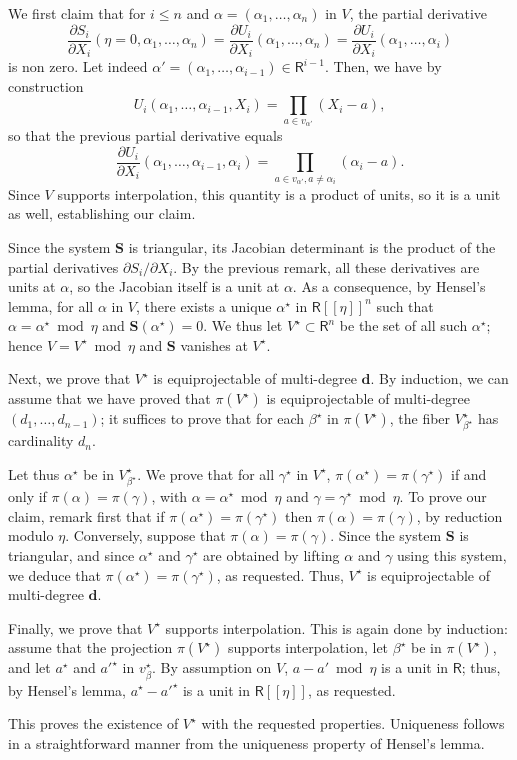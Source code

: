 \documentclass[amsthm]{elsart}
\def\d {\ensuremath{\mathbf{d}}}
\def\S {\ensuremath{\mathbf{S}}}
\def\rng {\ensuremath{\mathsf{R}}}
\theoremstyle{plain}
\begin{document}
\begin{pf}
We first claim that for $i \le n$ and $\alpha=(\alpha_1,\dots,\alpha_n)$ in $V$, the
partial derivative
$$\frac{\partial S_i}{\partial X_i}(\eta=0,\alpha_1,\dots,\alpha_n) = 
\frac{\partial U_i}{\partial X_i}(\alpha_1,\dots,\alpha_n) = 
\frac{\partial U_i}{\partial X_i}(\alpha_1,\dots,\alpha_i)$$ is non zero. 
Let indeed
$\alpha' = (\alpha_1,\dots,\alpha_{i-1}) \in \rng^{i-1}$.  Then, we
have by construction
$$U_i(\alpha_1,\dots,\alpha_{i-1},X_i) = \prod_{a \in v_{\alpha'}} (X_i-a),$$
so that the previous partial derivative equals
$$ \frac{\partial U_i}{\partial X_i}(\alpha_1,\dots,\alpha_{i-1},\alpha_i) = 
\prod_{a \in v_{\alpha'}, a\ne \alpha_i} (\alpha_i-a).$$ Since $V$
supports interpolation, this quantity is a product of units, so it is
a unit as well, establishing our claim.

Since the system $\S$ is triangular, its Jacobian determinant is the
product of the partial derivatives $\partial S_i/\partial X_i$. By the
previous remark, all these derivatives are units at $\alpha$, so the
Jacobian itself is a unit at $\alpha$. As a consequence, by Hensel's
lemma, for all $\alpha$ in $V$, there exists a unique $\alpha^\star$
in $\rng[[\eta]]^n$ such that $\alpha = \alpha^\star \bmod \eta$ and
$\S(\alpha^\star)=0$. We thus let ${V^\star} \subset \rng^n$ be the
set of all such $\alpha^\star$; hence $V={V^\star} \bmod \eta$ and
$\S$ vanishes at ${V^\star}$.

Next, we prove that ${V^\star}$ is equiprojectable of multi-degree
$\d$. By induction, we can assume that we have proved that
$\pi({V^\star})$ is equiprojectable of multi-degree
$(d_1,\dots,d_{n-1})$; it suffices to prove that for each
$\beta^\star$ in $\pi({V^\star})$, the fiber $V^\star_{\beta^\star}$
has cardinality $d_n$.

Let thus $\alpha^\star$ be in $V^\star_{\beta^\star}$. We prove that
for all $\gamma^\star$ in $V^\star$,
$\pi(\alpha^\star)=\pi(\gamma^\star)$ if and only if
$\pi(\alpha)=\pi(\gamma)$, with $\alpha=\alpha^\star \bmod \eta$ and
$\gamma=\gamma^\star \bmod \eta$.  To prove our claim, remark first
that if $\pi(\alpha^\star)=\pi(\gamma^\star)$ then
$\pi(\alpha)=\pi(\gamma)$, by reduction modulo $\eta$. Conversely,
suppose that $\pi(\alpha)=\pi(\gamma)$. Since the system $\S$ is
triangular, and since $\alpha^\star$ and $\gamma^\star$ are obtained
by lifting $\alpha$ and $\gamma$ using this system, we deduce that
$\pi(\alpha^\star)=\pi(\gamma^\star)$, as requested. Thus, ${V^\star}$
is equiprojectable of multi-degree $\d$.

Finally, we prove that ${V^\star}$ supports interpolation. This is
again done by induction: assume that the projection $\pi({V^\star})$
supports interpolation, let $\beta^\star$ be in $\pi({V^\star})$, and
let $a^\star$ and ${a'}^\star$ in $v^\star_\beta$. By assumption on
$V$, $a-a' \bmod \eta$ is a unit in $\rng$; thus, by Hensel's lemma,
$a^\star-{a'}^\star$ is a unit in $\rng[[\eta]]$, as requested.

This proves the existence of ${V^\star}$ with the requested
properties. Uniqueness follows in a straightforward manner from the
uniqueness property of Hensel's lemma.
\end{pf}
\end{document}

